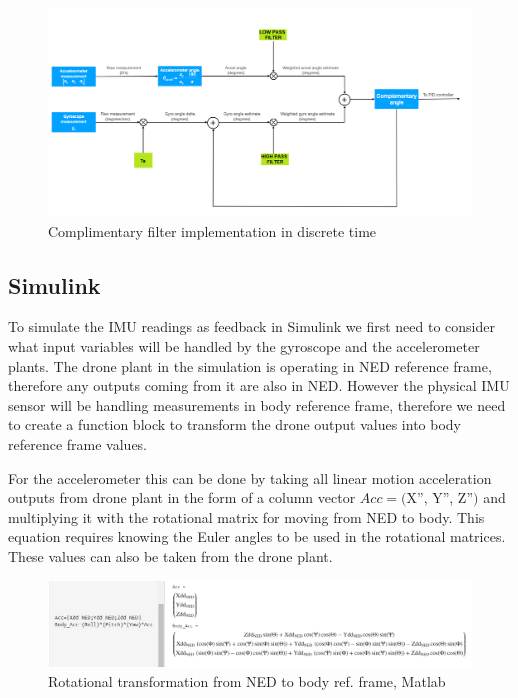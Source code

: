 \begin{figure}[H]
    \begin{center}
    \includegraphics[scale = 0.5]{pictures/IMU/complementary.png}
    \end{center}
    \caption{Complimentary filter implementation in discrete time}
    \label{fig:my_label}
\end{figure}

\subsection{Simulink}

To simulate the IMU readings as feedback in Simulink we first need to consider what input variables will be handled by the gyroscope and the accelerometer plants. The drone plant in the simulation is operating in NED reference frame, therefore any outputs coming from it are also in NED. However the physical IMU sensor will be handling measurements in body reference frame, therefore we need to create a function block to transform the drone output values into body reference frame values. 

For the accelerometer this can be done by taking all linear motion acceleration outputs from drone plant in the form of a column vector $Acc=($X'', Y'', Z''$)$ and multiplying it with the rotational matrix for moving from NED to body. This equation requires knowing the Euler angles to be used in the rotational matrices. These values can also be taken from the drone plant.


\begin{figure}[H]
    \begin{center}
    \includegraphics[scale = 0.5]{pictures/IMU/NED_to_body_acc.png}
    \end{center}
    \caption{Rotational transformation from NED to body ref. frame, Matlab}
    \label{fig:my_label}
\end{figure}

